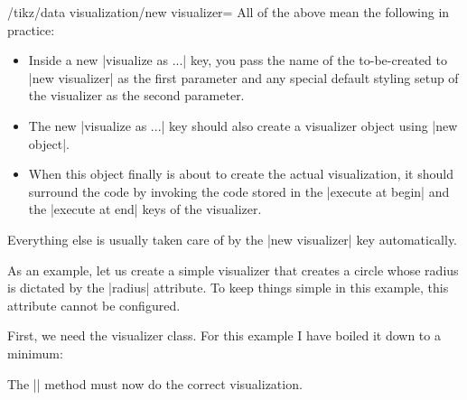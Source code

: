 \begin{key}{/tikz/data visualization/new visualizer=}
  All of the above mean the following in practice:
  \begin{itemize}
  \item Inside a new |visualize as ...| key, you pass the name of
    the to-be-created to |new visualizer| as the first parameter and
    any special default styling setup of the visualizer as the second
    parameter.
  \item The new |visualize as ...| key should also create a visualizer
    object using |new object|.
  \item When this object finally is about to create the actual
    visualization, it should surround the code by invoking the code
    stored in the |execute at begin| and the |execute at end| keys of
    the visualizer.
  \end{itemize}

  Everything else is usually taken care of by the |new visualizer| key
  automatically. 
\end{key}


As an example, let us create a simple visualizer that creates a
circle whose radius is dictated by the |radius| attribute. To keep
things simple in this example, this attribute cannot be configured.

First, we need the visualizer class. For this example I have boiled it
down to a minimum:


The |\dovisualization| method must now do the correct
visualization.

